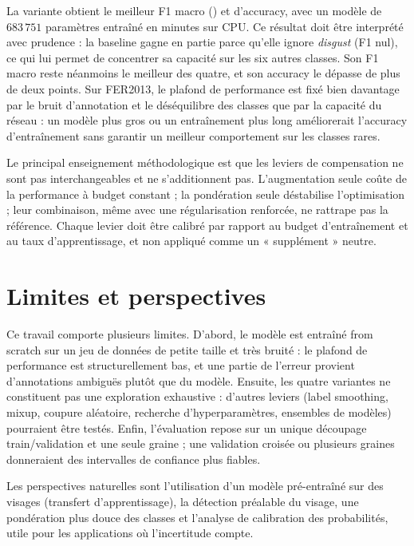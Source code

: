 \documentclass[11pt,a4paper]{article}
\newcommand{\NumParams}{683\,751}
\begin{document}
La variante \BestName{} obtient le meilleur F1 macro (\BestF) et
\BestAcc{} d'accuracy, avec un modèle de $\NumParams$ paramètres entraîné en
\BestTime{} minutes sur CPU. Ce résultat doit être interprété avec prudence :
la baseline gagne en partie parce qu'elle ignore \emph{disgust} (F1 nul), ce qui
lui permet de concentrer sa capacité sur les six autres classes. Son F1 macro
reste néanmoins le meilleur des quatre, et son accuracy le dépasse de plus de
deux points. Sur FER2013, le plafond de performance est fixé bien davantage par
le bruit d'annotation et le déséquilibre des classes que par la capacité du
réseau : un modèle plus gros ou un entraînement plus long améliorerait
l'accuracy d'entraînement sans garantir un meilleur comportement sur les
classes rares.

Le principal enseignement méthodologique est que les leviers de compensation ne
sont pas interchangeables et ne s'additionnent pas. L'augmentation seule coûte
de la performance à budget constant ; la pondération seule déstabilise
l'optimisation ; leur combinaison, même avec une régularisation renforcée, ne
rattrape pas la référence. Chaque levier doit être calibré par rapport au budget
d'entraînement et au taux d'apprentissage, et non appliqué comme un
« supplément » neutre.

\section{Limites et perspectives}

Ce travail comporte plusieurs limites. D'abord, le modèle est entraîné from
scratch sur un jeu de données de petite taille et très bruité : le plafond de
performance est structurellement bas, et une partie de l'erreur provient
d'annotations ambiguës plutôt que du modèle. Ensuite, les quatre variantes ne
constituent pas une exploration exhaustive : d'autres leviers (label smoothing,
mixup, coupure aléatoire, recherche d'hyperparamètres, ensembles de modèles)
pourraient être testés. Enfin, l'évaluation repose sur un unique découpage
train/validation et une seule graine ; une validation croisée ou plusieurs
graines donneraient des intervalles de confiance plus fiables.

Les perspectives naturelles sont l'utilisation d'un modèle pré-entraîné sur
des visages (transfert d'apprentissage), la détection préalable du visage, une
pondération plus douce des classes et l'analyse de calibration des
probabilités, utile pour les applications où l'incertitude compte.
\end{document}
